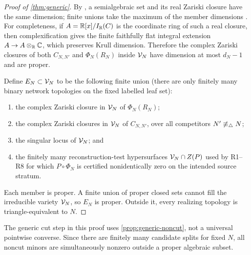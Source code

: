 \begin{proof}[Proof of \cref{thm:generic}]
By \cite[Proposition~2.8.2]{BochnakCosteRoy1998}, a semialgebraic set and its
real Zariski closure have the same dimension; finite unions take the maximum
of the member dimensions
\cite[Proposition~2.8.5(i)]{BochnakCosteRoy1998}.  For completeness, if
\(A=\mathbb R[x]/I_\mathbb R(C)\) is the coordinate ring of such a real closure, then
complexification gives the finite faithfully flat integral extension
\(A\to A\otimes_\mathbb R\mathbb C\), which preserves Krull dimension.  Therefore the
complex Zariski closures of both \(C_{N,N'}\) and \(\Phi_N(R_N)\) inside
\(\mathcal V_N\) have dimension at most \(d_N-1\) and are proper.

Define \(E_N\subset\mathcal V_N\) to be the following finite union (there are only
finitely many binary network topologies on the fixed labelled leaf set):
\begin{enumerate}[label=\textup{(\roman*)}]
  \item the complex Zariski closure in \(\mathcal V_N\) of \(\Phi_N(R_N)\);
  \item the complex Zariski closures in \(\mathcal V_N\) of \(C_{N,N'}\), over all
        competitors \(N'\not\equiv_\triangle N\);
  \item the singular locus of \(\mathcal V_N\); and
  \item the finitely many reconstruction-test hypersurfaces
        \(\mathcal V_N\cap Z(P)\) used by R1--R8 for which
        \(P\circ\Phi_N\) is certified nonidentically zero on the intended
        source stratum.
\end{enumerate}
Each member is proper.  A finite union of proper closed sets cannot fill the
irreducible variety \(\mathcal V_N\), so \(E_N\) is proper.  Outside it, every
realizing topology is triangle-equivalent to \(N\).
\end{proof}

The generic cut step in this proof uses \cref{prop:generic-noncut}, not a
universal pointwise converse.  Since there are finitely many candidate splits
for fixed \(N\), all noncut minors are simultaneously nonzero outside a
proper algebraic subset.

